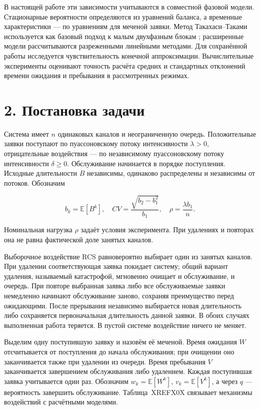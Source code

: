 В настоящей работе эти зависимости учитываются в совместной фазовой модели. Стационарные вероятности определяются из уравнений баланса, а временные характеристики --- по уравнениям для меченой заявки. Метод Такахаси--Таками используется как базовый подход к малым двухфазным блокам \cite{takahashi1976,ryzhikov2018ru}; расширенные модели рассчитываются разреженными линейными методами. Для сохранённой работы исследуется чувствительность конечной аппроксимации. Вычислительные эксперименты оценивают точность расчёта средних и стандартных отклонений времени ожидания и пребывания в рассмотренных режимах.

\section*{2. Постановка задачи}
Система имеет \(n\) одинаковых каналов и неограниченную очередь. Положительные заявки поступают по пуассоновскому потоку интенсивности \(\lambda>0\), отрицательные воздействия --- по независимому пуассоновскому потоку интенсивности \(\delta\ge0\). Обслуживание начинается в порядке поступления. Исходные длительности \(B\) независимы, одинаково распределены и независимы от потоков. Обозначим


\[b_k=\mathbb E[B^k],\quad CV=\frac{\sqrt{b_2-b_1^2}}{b_1},\quad \rho=\frac{\lambda b_1}{n}.\]


Номинальная нагрузка \(\rho\) задаёт условия эксперимента. При удалениях и повторах она не равна фактической доле занятых каналов.

Выборочное воздействие RCS равновероятно выбирает один из занятых каналов. При удалении соответствующая заявка покидает систему; общий вариант удаления, называемый катастрофой, мгновенно очищает и обслуживание, и очередь. При повторе выбранная заявка либо все обслуживаемые заявки немедленно начинают обслуживание заново, сохраняя преимущество перед ожидающими. После прерывания независимо выбирается новая длительность либо сохраняется первоначальная длительность данной заявки. В обоих случаях выполненная работа теряется. В пустой системе воздействие ничего не меняет.

Выделим одну поступившую заявку и назовём её меченой. Время ожидания \(W\) отсчитывается от поступления до начала обслуживания; при очищении оно заканчивается также при удалении из очереди. Время пребывания \(V\) заканчивается завершением обслуживания либо удалением. Каждая поступившая заявка учитывается один раз. Обозначим \(w_k=\mathbb E[W^k]\), \(v_k=\mathbb E[V^k]\), а через \(q\) --- вероятность завершить обслуживание. Таблица~XREFX0X связывает механизмы воздействий с расчётными моделями.

